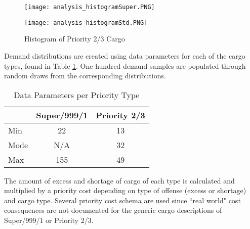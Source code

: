 \begin{figure}[H]
\centering
\begin{minipage}[b]{0.4\textwidth}
\texttt{[image: analysis\_histogramSuper.PNG]}
\caption{Histogram of Super/999/1 Cargo}
\label{fig_histogramSuper}
\end{minipage}
\hspace{10mm}
\begin{minipage}[b]{0.4\textwidth}
\texttt{[image: analysis\_histogramStd.PNG]}
\caption{Histogram of Priority 2/3 Cargo}
\label{fig_histogramStd}
\end{minipage}
\end{figure}
Demand distributions are created using data parameters for each of the cargo types, found in Table \ref{table_triangular}. One hundred demand samples are populated through random draws from the corresponding distributions.
\begin{table}[H]
\centering
\caption{Data Parameters per Priority Type}
\label{table_triangular}
\begin{tabular}{@{}lcc@{}}
\toprule
 & Super/999/1 & Priority 2/3 \\ \midrule
Min & 22 & 13 \\
Mode & N/A & 32 \\
Max & 155 & 49 \\ \bottomrule
\end{tabular}
\end{table}
The amount of excess and shortage of cargo of each type is calculated and multiplied by a priority cost depending on type of offense (excess or shortage) and cargo type. Several priority cost schema are used since ``real world" cost consequences are not documented for the generic cargo descriptions of Super/999/1 or Priority 2/3.  

